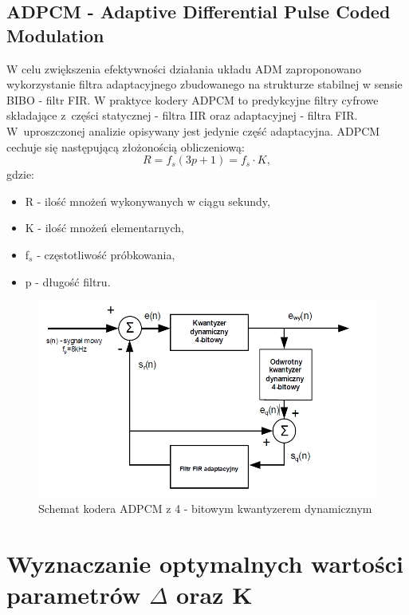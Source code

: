 \documentclass[12pt, a4paper, oneside]{article}
\begin{document}
\subsection{ADPCM - Adaptive Differential Pulse Coded Modulation}
W celu zwiększenia efektywności działania układu ADM zaproponowano wykorzystanie filtra adaptacyjnego zbudowanego na strukturze stabilnej w sensie BIBO - filtr FIR. W praktyce kodery ADPCM to predykcyjne filtry cyfrowe składające z~części statycznej - filtra IIR oraz adaptacyjnej - filtra FIR. W~uproszczonej analizie opisywany jest jedynie część adaptacyjna. ADPCM cechuje się następującą złożonością obliczeniową:
\begin{equation}
R=f_s(3p+1)=f_s\cdot K,
\end{equation}
gdzie:
\begin{itemize}
\item R - ilość mnożeń wykonywanych w ciągu sekundy,
\item K - ilość mnożeń elementarnych,
\item f$_s$ - częstotliwość próbkowania,
\item p - długość filtru.
\end{itemize}
\begin{figure}[h]
\centering
\caption{Schemat kodera ADPCM z 4 - bitowym kwantyzerem dynamicznym}
\includegraphics[scale=0.46]{f1.png}
\end{figure}
\clearpage
\section{Wyznaczanie optymalnych wartości parametrów $\Delta$ oraz K}
\end{document}
